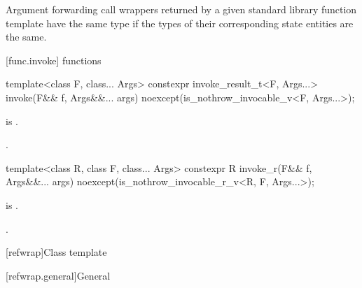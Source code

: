 \pnum
Argument forwarding call wrappers returned by
a given standard library function template have the same type
if the types of their corresponding state entities are the same.

[func.invoke]{ functions}
%
%
\begin{itemdecl}
template<class F, class... Args>
  constexpr invoke_result_t<F, Args...> invoke(F&& f, Args&&... args)
    noexcept(is_nothrow_invocable_v<F, Args...>);
\end{itemdecl}

\begin{itemdescr}
\pnum
\constraints
{} is .

\pnum
\returns
{}.
\end{itemdescr}

%
\begin{itemdecl}
template<class R, class F, class... Args>
  constexpr R invoke_r(F&& f, Args&&... args)
    noexcept(is_nothrow_invocable_r_v<R, F, Args...>);
\end{itemdecl}

\begin{itemdescr}
\pnum
\constraints
{} is .

\pnum
\returns
{}.
\end{itemdescr}

[refwrap]{Class template }

[refwrap.general]{General}

